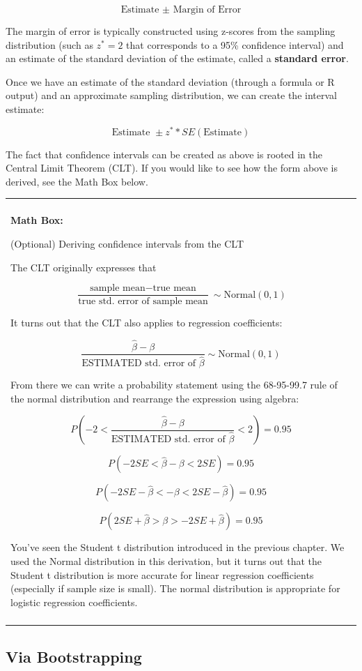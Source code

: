 \documentclass[]{book}
\newenvironment{mathbox}
{
    \begin{center}
    
    \begin{tabular}{|p{0.8\textwidth}|}
    \rowcolor{LightYellow}
    \hline\\
    \rowcolor{LightYellow}
    \textbf{Math Box:}
}
{
    \\\rowcolor{LightYellow}
    \\\hline
    \end{tabular} 
    \end{center}
}
\begin{document}
\[\text{Estimate }\pm \text{ Margin of Error}\]

The margin of error is typically constructed using z-scores from the sampling distribution (such as \(z^* = 2\) that corresponds to a 95\% confidence interval) and an estimate of the standard deviation of the estimate, called a \textbf{standard error}.

Once we have an estimate of the standard deviation (through a formula or R output) and an approximate sampling distribution, we can create the interval estimate:

\[\text{Estimate }\pm z^* *SE(\text{Estimate})\]

The fact that confidence intervals can be created as above is rooted in the Central Limit Theorem (CLT). If you would like to see how the form above is derived, see the Math Box below.

\begin{mathbox}
(Optional) Deriving confidence intervals from the CLT

The CLT originally expresses that

\[ \frac{\text{sample mean} - \text{true mean}}{\text{true std. error of sample mean}} \sim \text{Normal}(0,1) \]

It turns out that the CLT also applies to regression coefficients:

\[ \frac{\hat{\beta} - \beta}{\text{ESTIMATED std. error of }\hat{\beta}} \sim \text{Normal}(0,1)\]

From there we can write a probability statement using the 68-95-99.7
rule of the normal distribution and rearrange the expression using
algebra:

\[ P(-2 < \frac{\hat{\beta} - \beta}{\text{ESTIMATED std. error of }\hat{\beta}} < 2 ) = 0.95 \]

\[ P(-2 SE < \hat{\beta} - \beta < 2 SE ) = 0.95 \]

\[ P(-2 SE-\hat{\beta} <  -\beta < 2 SE-\hat{\beta} ) = 0.95 \]

\[ P(2 SE+\hat{\beta} > \beta > -2 SE+\hat{\beta} ) = 0.95 \]

You've seen the Student t distribution introduced in the previous
chapter. We used the Normal distribution in this derivation, but it
turns out that the Student t distribution is more accurate for linear
regression coefficients (especially if sample size is small). The normal
distribution is appropriate for logistic regression coefficients.
\end{mathbox}

\hypertarget{via-bootstrapping}{%
\subsection{Via Bootstrapping}\label{via-bootstrapping}}
\end{document}
